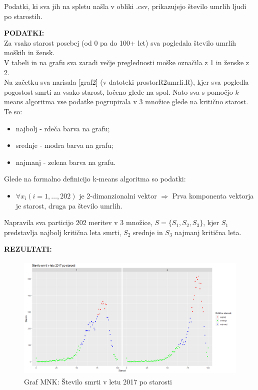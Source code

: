 \documentclass[11pt, a4paper]{article}
\begin{document}
\noindent Podatki, ki sva jih na spletu našla v obliki .csv, prikazujejo število umrlih ljudi po starostih.  

\vspace{0.5 cm}

\noindent \textbf{PODATKI:} \\
\noindent  Za vsako starost posebej (od 0 pa do 100+ let) sva pogledala število umrlih moških in žensk.  \\
\noindent V tabeli in na grafu sva zaradi večje preglednosti moške označila z 1 in ženske z 2. \\

\noindent Na začetku sva narisala [graf2] (v datoteki prostorR2umrli.R), kjer sva pogledla pogostost smrti za vsako starost, ločeno glede na spol. 
\noindent Nato sva s pomočjo \textsl{k}-means algoritma vse podatke pogrupirala v 3 množice glede na kritično starost. Te so:
\begin{itemize}
	\item najbolj - rdeča barva na grafu;
	\item srednje - modra barva na grafu; 
	\item najmanj - zelena barva na grafu.
\end{itemize}

\noindent Glede na formalno definicijo k-means algoritma so podatki:
\begin{itemize}
	\item $\forall x_i (i = 1,\ldots,202)$ je 2-dimanzionalni vektor $\Rightarrow$  Prva komponenta vektorja je starost, druga pa število umrlih.
\end{itemize}
Napravila sva particijo 202 meritev v 3 množice, $S = \{S_1, S_2, S_3\}$, kjer $S_1$ predstavlja najbolj kritična leta smrti, $S_2$ srednje  in $S_3$ najmanj kritična leta.

\vspace{0.5 cm}

\noindent \textbf{REZULTATI:} \\
\begin{figure}[h]
\caption{Graf MNK: Število smrti v letu 2017 po starosti}
\centering
\includegraphics[width=12cm, height=6cm]{grafMNKumrli}
\end{figure}
\end{document}
